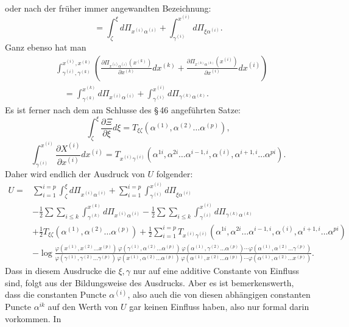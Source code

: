 \documentclass[10pt]{article}
\begin{document}
\endgroup
oder nach der früher immer angewandten Bezeichnung:
\[
=\int_{\zeta}^{\xi}d\Pi_{x^{(i)}\alpha^{(i)}}+
\int_{\gamma^{(i)}}^{x^{(i)}}d\Pi_{\xi\alpha^{(i)}}.
\]
Ganz ebenso hat man
\begingroup\footnotesize
\[
\begin{aligned}
&\int_{\gamma^{(i)},\gamma^{(k)}}^{x^{(i)},x^{(k)}}
\left(\frac{\partial\Pi_{x^{(i)}\alpha^{(i)}}(x^{(k)})}{\partial x^{(k)}}dx^{(k)}
+\frac{\partial\Pi_{x^{(k)}\alpha^{(k)}}(x^{(i)})}{\partial x^{(i)}}dx^{(i)}\right)\\
&\quad=\int_{\gamma^{(k)}}^{x^{(k)}}d\Pi_{x^{(i)}\alpha^{(i)}}+
\int_{\gamma^{(i)}}^{x^{(i)}}d\Pi_{\gamma^{(k)}\alpha^{(k)}}.
\end{aligned}
\]
\endgroup
Es ist ferner nach dem am Schlusse des \S\,46 angeführten Satze:
\[
\int_{\zeta}^{\xi}\frac{\partial\Xi}{\partial\xi}d\xi
=T_{\xi\zeta}(\alpha^{(1)},\alpha^{(2)}\ldots\alpha^{(p)}),
\]
\[
\int_{\gamma^{(i)}}^{x^{(i)}}\frac{\partial X^{(i)}}{\partial x^{(i)}}dx^{(i)}
=T_{x^{(i)}\gamma^{(i)}}(\alpha^{1i},\alpha^{2i}\ldots\alpha^{i-1,i},\alpha^{(i)},\alpha^{i+1,i}\ldots\alpha^{pi}).
\]
Daher wird endlich der Ausdruck von \(U\) folgender:
\begingroup\scriptsize
\[
\begin{aligned}
U={}&\sum_{i=1}^{i=p}\int_{\zeta}^{\xi}d\Pi_{x^{(i)}\alpha^{(i)}}
+\sum_{i=1}^{i=p}\int_{\gamma^{(i)}}^{x^{(i)}}d\Pi_{\xi\alpha^{(i)}}\\
&-\frac12\sum\sum_{i\le k}\int_{\gamma^{(k)}}^{x^{(k)}}d\Pi_{x^{(i)}\alpha^{(i)}}
-\frac12\sum\sum_{i\le k}\int_{\gamma^{(i)}}^{x^{(i)}}d\Pi_{\gamma^{(k)}\alpha^{(k)}}\\
&+\frac12T_{\xi\zeta}(\alpha^{(1)},\alpha^{(2)}\ldots\alpha^{(p)})
+\frac12\sum_{i=1}^{i=p}T_{x^{(i)}\gamma^{(i)}}(\alpha^{1i},\alpha^{2i}\ldots\alpha^{i-1,i},\alpha^{(i)},\alpha^{i+1,i}\ldots\alpha^{pi})\\
&-\log\frac{\varphi(x^{(1)},x^{(2)}\ldots x^{(p)})\,\varphi(\gamma^{(1)},\alpha^{(2)}\ldots\alpha^{(p)})\,\varphi(\alpha^{(1)},\gamma^{(2)}\ldots\alpha^{(p)})\cdots\varphi(\alpha^{(1)},\alpha^{(2)}\ldots\gamma^{(p)})}
{\varphi(\gamma^{(1)},\gamma^{(2)}\ldots\gamma^{(p)})\,\varphi(x^{(1)},\alpha^{(2)}\ldots\alpha^{(p)})\,\varphi(\alpha^{(1)},x^{(2)}\ldots\alpha^{(p)})\cdots\varphi(\alpha^{(1)},\alpha^{(2)}\ldots x^{(p)})}.
\end{aligned}
\]
\endgroup
Dass in diesem Ausdrucke die \(\xi,\gamma\) nur auf eine additive Constante von Einfluss sind, folgt aus der Bildungsweise des Ausdrucks. Aber es ist bemerkenswerth, dass die constanten Puncte \(\alpha^{(i)}\), also auch die von diesen abhängigen constanten Puncte \(\alpha^{ik}\) auf den Werth von \(U\) gar keinen Einfluss haben, also nur formal darin vorkommen. In
\end{document}
